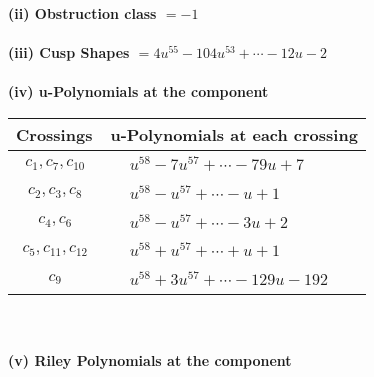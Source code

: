 \documentclass[1p]{elsarticle_modified}
\theoremstyle{definition}
\begin{document}
\flushleft \textbf{(ii) Obstruction class $= -1$}\\~\\
\flushleft \textbf{(iii) Cusp Shapes $= 4 u^{55}-104 u^{53}+\cdots-12 u-2$}\\~\\
\newpage\renewcommand{\arraystretch}{1}
\flushleft \textbf{(iv) u-Polynomials at the component}\newline \\
\begin{tabular}{m{50pt}|m{274pt}}
Crossings & \hspace{64pt}u-Polynomials at each crossing \\
\hline $$\begin{aligned}c_{1},c_{7},c_{10}\end{aligned}$$&$\begin{aligned}
&u^{58}-7 u^{57}+\cdots-79 u+7
\end{aligned}$\\
\hline $$\begin{aligned}c_{2},c_{3},c_{8}\end{aligned}$$&$\begin{aligned}
&u^{58}- u^{57}+\cdots- u+1
\end{aligned}$\\
\hline $$\begin{aligned}c_{4},c_{6}\end{aligned}$$&$\begin{aligned}
&u^{58}- u^{57}+\cdots-3 u+2
\end{aligned}$\\
\hline $$\begin{aligned}c_{5},c_{11},c_{12}\end{aligned}$$&$\begin{aligned}
&u^{58}+u^{57}+\cdots+u+1
\end{aligned}$\\
\hline $$\begin{aligned}c_{9}\end{aligned}$$&$\begin{aligned}
&u^{58}+3 u^{57}+\cdots-129 u-192
\end{aligned}$\\
\hline
\end{tabular}\\~\\
\newpage\renewcommand{\arraystretch}{1}
\flushleft \textbf{(v) Riley Polynomials at the component}\newline \\
\end{document}
